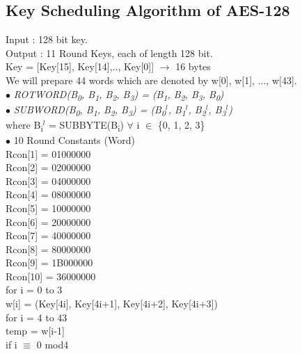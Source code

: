 \documentclass[11pt]{article}
\begin{document}
	\subsection{Key Scheduling Algorithm of AES-128}
	Input : 128 bit key.\\
	Output : 11 Round Keys, each of length 128 bit.\vspace{0.2cm}\\
	Key = [Key[15], Key[14],.., Key[0]] $\rightarrow$ 16 bytes\\
	We will prepare 44 words which are denoted by w[0], w[1], ..., w[43].\vspace{0.1cm}\\
	$\bullet$ \textit{ROTWORD(B\textsubscript{0}, B\textsubscript{1}, B\textsubscript{2}, B\textsubscript{3}) = (B\textsubscript{1}, B\textsubscript{2}, B\textsubscript{3}, B\textsubscript{0})}\\
	$\bullet$ \textit{SUBWORD(B\textsubscript{0}, B\textsubscript{1}, B\textsubscript{2}, B\textsubscript{3}) = (B\textsubscript{0}$^l$, B\textsubscript{1}$^l$, B\textsubscript{2}$^l$, B\textsubscript{3}$^l$)}\\
	where B\textsubscript{i}$^l$ = SUBBYTE(B\textsubscript{i}) $\forall$ i $\in$ \{0, 1, 2, 3\}\vspace{0.1cm}\\
	$\bullet$ 10 Round Constants (Word)\\
	Rcon[1] = 01000000\\
	Rcon[2] = 02000000\\
	Rcon[3] = 04000000\\
	Rcon[4] = 08000000\\
	Rcon[5] = 10000000\\
	Rcon[6] = 20000000\\
	Rcon[7] = 40000000\\
	Rcon[8] = 80000000\\
	Rcon[9] = 1B000000\\
	Rcon[10] = 36000000\vspace{0.1cm}\\
	for i = 0 to 3\\
	\hspace*{0.8cm}w[i] = (Key[4i], Key[4i+1], Key[4i+2], Key[4i+3])\vspace{0.1cm}\\
	for i = 4 to 43\\
	\hspace*{0.8cm}temp = w[i-1]\\
	\hspace*{0.8cm}if i $\equiv$ 0 mod4\\
\end{document}
